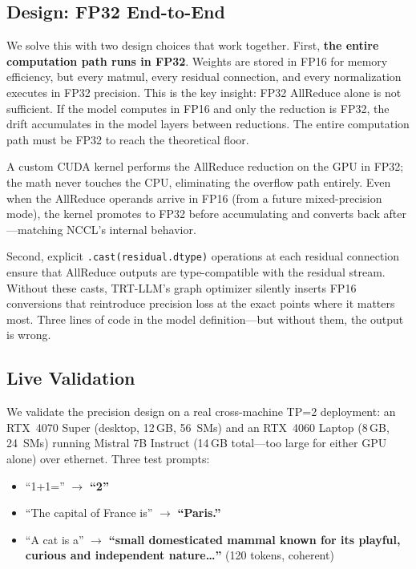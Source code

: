 \documentclass[10pt,twocolumn]{article}
\begin{document}
\subsection{Design: FP32 End-to-End}\label{sec:prec-design}

We solve this with two design choices that work together.  First,
\textbf{the entire computation path runs in FP32}.  Weights are stored in
FP16 for memory efficiency, but every matmul, every residual connection,
and every normalization executes in FP32 precision.  This is the key
insight: FP32 AllReduce alone is not sufficient.  If the model computes in
FP16 and only the reduction is FP32, the drift accumulates in the model
layers between reductions.  The entire computation path must be FP32 to
reach the theoretical floor.

A custom CUDA kernel performs the AllReduce reduction on the GPU in FP32;
the math never touches the CPU, eliminating the overflow path entirely.
Even when the AllReduce operands arrive in FP16 (from a future
mixed-precision mode), the kernel promotes to FP32 before accumulating and
converts back after---matching NCCL's internal behavior.

Second, explicit \texttt{.cast(residual.dtype)} operations at each
residual connection ensure that AllReduce outputs are type-compatible with
the residual stream.  Without these casts, TRT-LLM's graph optimizer
silently inserts FP16 conversions that reintroduce precision loss at the
exact points where it matters most.  Three lines of code in the model
definition---but without them, the output is wrong.

\subsection{Live Validation}\label{sec:prec-live}

We validate the precision design on a real cross-machine TP=2 deployment:
an RTX~4070 Super (desktop, 12\,GB, 56~SMs) and an RTX~4060 Laptop
(8\,GB, 24~SMs) running Mistral 7B Instruct (14\,GB total---too large for
either GPU alone) over ethernet.  Three test prompts:
%
\begin{itemize}[nosep,leftmargin=*]
  \item ``1+1='' $\rightarrow$ \textbf{``2''}
  \item ``The capital of France is'' $\rightarrow$ \textbf{``Paris.''}
  \item ``A cat is a'' $\rightarrow$ \textbf{``small domesticated mammal
    known for its playful, curious and independent nature\ldots''} (120
    tokens, coherent)
\end{itemize}
\end{document}

